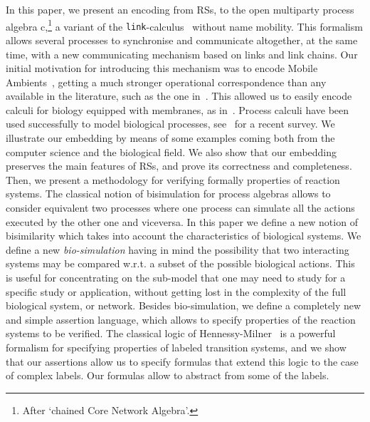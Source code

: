 In this paper, we present an encoding from RSs, 
to the open multiparty process algebra c\CNA,\footnote{After `chained Core Network 
Algebra'.} a variant of the {\tt link}-calculus~\cite{BodeiBB12,BBB17} without name mobility.
This formalism allows several processes to synchronise and 
communicate altogether, at the same time, with a new communicating
mechanism based on links and link chains. 
Our initial motivation for introducing this mechanism was to encode
Mobile Ambients~\cite{CardelliG00}, getting a much stronger operational
correspondence than any available in the literature, such as the one in~\cite{B16}.
 This allowed us to easily encode calculi for biology equipped with membranes, as in~\cite{BodeiBBC14}.
Process calculi have been used successfully to model
biological processes, see~\cite{BBDFH18} for a recent survey.
We illustrate our embedding by means of some examples coming
both from the computer science and the biological field.
We also show that our embedding preserves the main
features of RSs, and prove its correctness and completeness.
Then, we present a methodology for verifying formally
properties of reaction systems. The classical notion of bisimulation for 
process algebras allows to consider equivalent two processes
where one process can simulate all the actions executed 
by the other one and viceversa. In this paper we define a new
notion of bisimilarity which takes into account the characteristics
of biological systems. We define a new {\em bio-simulation} having in mind
the possibility that two interacting systems may be compared w.r.t.
a subset of the possible biological actions. This is useful for concentrating 
on the sub-model that one may need to study for a specific study or application,
without getting lost in the complexity of the full biological system, or network.
Besides bio-simulation, we define a completely new and simple assertion language,
which allows to specify properties of the reaction systems to be verified.
The classical logic of Hennessy-Milner~\cite{HM80} is a powerful
formalism for specifying properties of labeled transition systems, 
and we show that our assertions allow us to specify formulas 
that extend this logic to the case of complex labels.
Our formulas allow to abstract from some of the labels.

